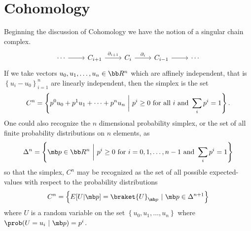 \documentclass[12pt,letterpaper]{article}
\begin{document}
\section{Cohomology}

Beginning the discussion of Cohomology we have the notion of a singular chain
complex.  
\begin{equation*} 
    \begin{tikzcd} 
        \cdots \ar[r] & C_{i+1} \ar[r,"\partial_{i+1}"] & C_i 
        \ar[r, "\partial_i"] & C_{i-1} \ar[r] & \cdots
    \end{tikzcd} 
\end{equation*} 
If we take vectors $u_0, u_1, \ldots, u_n \in \bb R^n$ which are affinely independent, 
that is $\left\{ u_i-u_0 \right\}_{i=1}^n$ are linearly independent, 
then the simplex is the set 
\begin{equation*} 
    C^n = \left\{  p^0u_0+p^1u_1+\cdots+p^nu_n ~\biggr |~ p^i \geq 0 \textup{ for all
    } i \textup{ and } \sum_{i} p^i = 1 \right\}.  
\end{equation*} 
One could also recognize the $n$ dimensional probability simplex, or the set of all
finite probability distributions on $n$ elements, as 
\begin{equation*}
    \Delta^n = \left\{ \mb p \in \bb R^n ~\biggr |~ p^i \geq 0 \textup{ for } 
    i=0,1,\ldots,{n-1} \textup{ and } \sum_i p^i = 1 \right\}
\end{equation*} 
so that the simplex, $C^n$ may be recognized as the set of all possible expected-values 
with respect to the probability distributions
\begin{equation*} 
    C^n = \left\{ E[U|\mb p] = \braket{U}_{\mb p} ~|~ \mb p
        \in \Delta^{n+1}\right\} 
\end{equation*} 
where $U$ is a random variable on the set $\left\{ u_0, u_1, \ldots, u_n \right\}$ 
where $\prob(U=u_i ~|~ \mb p) = p^i$.





\end{document}
